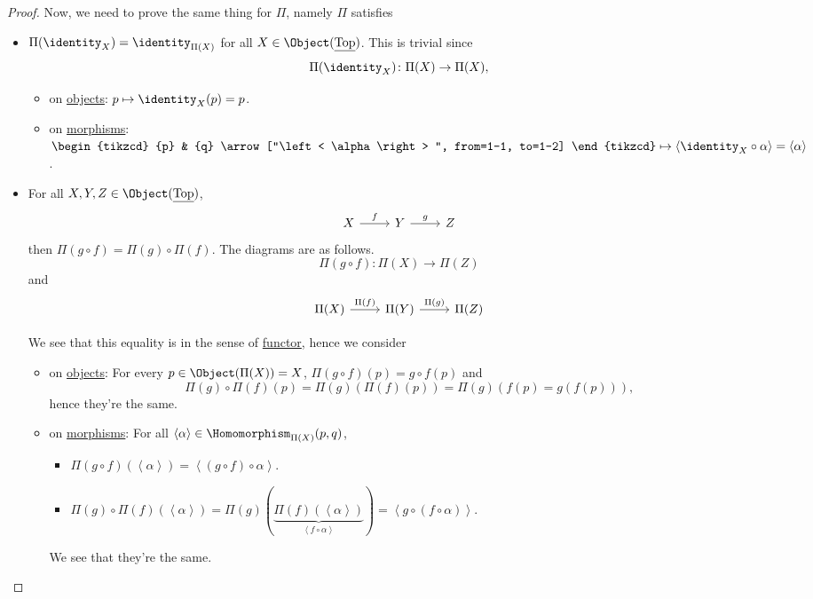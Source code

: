 \begin{proof}
	Now, we need to prove the same thing for \(\Pi\), namely \(\Pi \) satisfies
	\begin{itemize}
		\item \(\Pi (\identity_{X} ) = \identity_{\Pi (X)} \) for all \(X\in \Object (\underline{\mathrm{Top}})\). This is trivial since
		      \[
			      \Pi (\identity_{X} )\colon \Pi (X)\to \Pi (X),
		      \]
		      \begin{itemize}
			      \item on \hyperref[def:object]{objects}: \(p\mapsto \identity_{X} (p) = p\).
			      \item on \hyperref[def:morphism]{morphisms}: \(\begin{tikzcd}
				            {p} & {q}
				            \arrow["\left< \alpha  \right> ", from=1-1, to=1-2]
			            \end{tikzcd}\mapsto \left< \identity_{X} \circ \alpha  \right> = \left< \alpha  \right>  \).
		      \end{itemize}
		\item For all \(X, Y, Z\in \Object (\underline{\mathrm{Top} })\),
		      \[
			      \begin{tikzcd}
				      {X} & {Y} & {Z}
				      \arrow["f", from=1-1, to=1-2]
				      \arrow["g", from=1-2, to=1-3]
			      \end{tikzcd}
		      \]
		      then \(\Pi (g\circ f) = \Pi (g)\circ \Pi (f)\). The diagrams are as follows.
		      \[
			      \Pi (g\circ f)\colon \Pi (X)\to \Pi (Z)
		      \]
		      and
		      \[
			      \begin{tikzcd}
				      {\Pi (X)} & {\Pi (Y)} & {\Pi (Z)}
				      \arrow["\Pi (f)", from=1-1, to=1-2]
				      \arrow["\Pi (g)", from=1-2, to=1-3]
			      \end{tikzcd}
		      \]

		      We see that this equality is in the sense of \hyperref[def:functor]{functor}, hence we consider
		      \begin{itemize}
			      \item on \hyperref[def:object]{objects}: For every \(p\in \Object (\Pi (X)) = X\), \(\Pi (g\circ f)(p) = g\circ f(p)\) and
			            \[
				            \Pi (g)\circ \Pi (f)(p) = \Pi (g)(\Pi (f)(p))=\Pi (g)(f(p)=g(f(p))),
			            \]
			            hence they're the same.
			      \item on \hyperref[def:morphism]{morphisms}: For all \(\left< \alpha  \right> \in \Homomorphism _{\Pi (X)}(p, q)\),
			            \begin{itemize}
				            \item \(\Pi (g\circ f)(\left< \alpha  \right> ) = \left< (g\circ f)\circ \alpha  \right> \).
				            \item \(\Pi (g)\circ \Pi (f)(\left< \alpha  \right> ) = \Pi (g)(\underbrace{\Pi (f)(\left< \alpha  \right> )}_{\left< f\circ \alpha  \right> }) = \left< g\circ \left(f\circ \alpha \right) \right> \).
			            \end{itemize}
			            We see that they're the same.
		      \end{itemize}
	\end{itemize}
\end{proof}